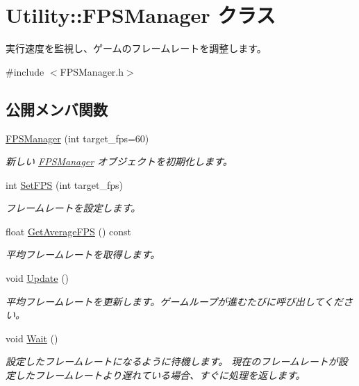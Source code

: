 \hypertarget{class_utility_1_1_f_p_s_manager}{}\section{Utility\+:\+:F\+P\+S\+Manager クラス}
\label{class_utility_1_1_f_p_s_manager}


実行速度を監視し、ゲームのフレームレートを調整します。 




{\ttfamily \#include $<$F\+P\+S\+Manager.\+h$>$}

\subsection*{公開メンバ関数}
\begin{DoxyCompactItemize}
\item 
\hyperlink{class_utility_1_1_f_p_s_manager_aa182e73499c8caa2067a0b5d578fb30e}{F\+P\+S\+Manager} (int target\+\_\+fps=60)
\begin{DoxyCompactList}\small\item\em 新しい \hyperlink{class_utility_1_1_f_p_s_manager}{F\+P\+S\+Manager} オブジェクトを初期化します。\end{DoxyCompactList}\item 
int \hyperlink{class_utility_1_1_f_p_s_manager_adf0d4b298671ae460a6fd257eed65c3c}{Set\+F\+PS} (int target\+\_\+fps)
\begin{DoxyCompactList}\small\item\em フレームレートを設定します。\end{DoxyCompactList}\item 
float \hyperlink{class_utility_1_1_f_p_s_manager_aac98d1d4eb031eb66d991ddda53ce243}{Get\+Average\+F\+PS} () const 
\begin{DoxyCompactList}\small\item\em 平均フレームレートを取得します。\end{DoxyCompactList}\item 
void \hyperlink{class_utility_1_1_f_p_s_manager_a31cb7c72fdf5c1ed283dec130610494a}{Update} ()
\begin{DoxyCompactList}\small\item\em 平均フレームレートを更新します。ゲームループが進むたびに呼び出してください。 \end{DoxyCompactList}\item 
void \hyperlink{class_utility_1_1_f_p_s_manager_a16df4d2542235515fcc3b09d32c1a101}{Wait} ()
\begin{DoxyCompactList}\small\item\em 設定したフレームレートになるように待機します。 現在のフレームレートが設定したフレームレートより遅れている場合、すぐに処理を返します。 \end{DoxyCompactList}\end{DoxyCompactItemize}


